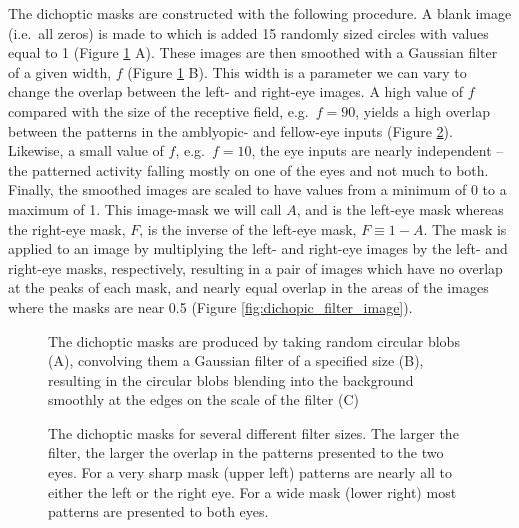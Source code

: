 \documentclass[
  sn-apa,
  pdflatex]{sn-jnl}
\theoremstyle{thmstyleone}%
\theoremstyle{thmstyletwo}%
\theoremstyle{thmstylethree}%
\begin{document}
The dichoptic masks are constructed with the following procedure. A
blank image (i.e.~all zeros) is made to which is added 15 randomly sized
circles with values equal to 1 (Figure \ref{fig:dichopic_blob} A). These
images are then smoothed with a Gaussian filter of a given width, \(f\)
(Figure \ref{fig:dichopic_blob} B). This width is a parameter we can
vary to change the overlap between the left- and right-eye images. A
high value of \(f\) compared with the size of the receptive field,
e.g.~\(f=90\), yields a high overlap between the patterns in the
amblyopic- and fellow-eye inputs (Figure
\ref{fig:dichopic_filter_size}). Likewise, a small value of \(f\),
e.g.~\(f=10\), the eye inputs are nearly independent -- the patterned
activity falling mostly on one of the eyes and not much to both.
Finally, the smoothed images are scaled to have values from a minimum of
0 to a maximum of 1. This image-mask we will call \(A\), and is the
left-eye mask whereas the right-eye mask, \(F\), is the inverse of the
left-eye mask, \(F\equiv 1-A\). The mask is applied to an image by
multiplying the left- and right-eye images by the left- and right-eye
masks, respectively, resulting in a pair of images which have no overlap
at the peaks of each mask, and nearly equal overlap in the areas of the
images where the masks are near 0.5 (Figure
\ref{fig:dichopic_filter_image}).

\begin{figure}
\hypertarget{fig:dichopic_blob}{%
\centering

\caption{The dichoptic masks are produced by taking random circular
blobs (A), convolving them a Gaussian filter of a specified size (B),
resulting in the circular blobs blending into the background smoothly at
the edges on the scale of the filter (C)}\label{fig:dichopic_blob}
}
\end{figure}

\begin{figure}
\hypertarget{fig:dichopic_filter_size}{%
\centering

\caption{The dichoptic masks for several different filter sizes. The
larger the filter, the larger the overlap in the patterns presented to
the two eyes. For a very sharp mask (upper left) patterns are nearly all
to either the left or the right eye. For a wide mask (lower right) most
patterns are presented to both eyes.}\label{fig:dichopic_filter_size}
}
\end{figure}
\end{document}
